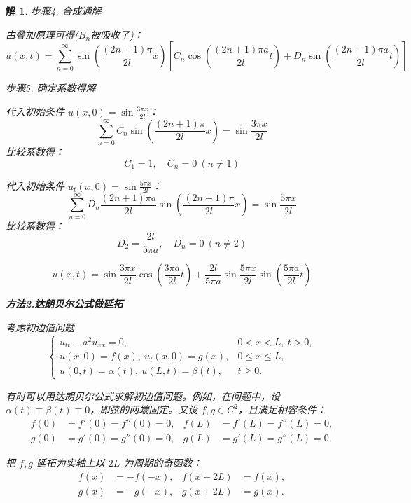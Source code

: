\documentclass[12pt,a4paper]{article}
\newtheorem*{solution}{解}
\begin{document}
\begin{solution}
	步骤4. 合成通解
		
	\noindent
	由叠加原理可得($B_n$被吸收了)：
	\[
	u(x,t) = \sum_{n=0}^\infty \sin\left( \frac{(2n+1)\pi}{2l} x \right) \left[ C_n \cos\left( \frac{(2n+1)\pi a}{2l} t \right) + D_n \sin\left( \frac{(2n+1)\pi a}{2l} t \right) \right]
	\]
	
步骤5. 确定系数得解
		
	\noindent
	代入初始条件 \( u(x,0) = \sin\frac{3\pi x}{2l} \)：
	\[
	\sum_{n=0}^\infty C_n \sin\left( \frac{(2n+1)\pi}{2l} x \right) = \sin\frac{3\pi x}{2l}
	\]
	比较系数得：
	\[
	C_1 = 1,\quad C_n = 0\ (n \neq 1)
	\]
	
	代入初始条件 \( u_t(x,0) = \sin\frac{5\pi x}{2l} \)：
	\[
	\sum_{n=0}^\infty D_n \frac{(2n+1)\pi a}{2l} \sin\left( \frac{(2n+1)\pi}{2l} x \right) = \sin\frac{5\pi x}{2l}
	\]
	比较系数得：
	\[
	D_2 = \frac{2l}{5\pi a},\quad D_n = 0\ (n \neq 2)
	\]
	
	\[
	u(x,t) = \sin\frac{3\pi x}{2l} \cos\left( \frac{3\pi a}{2l} t \right) + \frac{2l}{5\pi a} \sin\frac{5\pi x}{2l} \sin\left( \frac{5\pi a}{2l} t \right)
	\]
	
	
	\newpage
	\textbf{方法2.达朗贝尔公式做延拓}


考虑初边值问题
\begin{equation*}
	\begin{cases}
		u_{tt} - a^2 u_{xx} = 0, & 0 < x < L, \ t > 0, \\
		u(x, 0) = f(x), \ u_t(x, 0) = g(x), & 0 \leq x \leq L, \\
		u(0, t) = \alpha(t), \ u(L, t) = \beta(t), & t \geq 0.
	\end{cases}
\end{equation*}
	
	有时可以用达朗贝尔公式求解初边值问题。例如，在问题中，设 \(\alpha(t) \equiv \beta(t) \equiv 0\)，即弦的两端固定。又设 \(f, g \in C^2\)，且满足相容条件：
	\begin{equation*}
		\begin{aligned}
			f(0) &= f'(0) = f''(0) = 0, & f(L) &= f'(L) = f''(L) = 0, \\
			g(0) &= g'(0) = g''(0) = 0, & g(L) &= g'(L) = g''(L) = 0.
		\end{aligned}
	\end{equation*}
	
	把 \(f, g\) 延拓为实轴上以 \(2L\) 为周期的奇函数：	
	\begin{equation*}
		\begin{aligned}
			f(x) &= -f(-x), & f(x + 2L) &= f(x), \\
			g(x) &= -g(-x), & g(x + 2L) &= g(x).
		\end{aligned}
	\end{equation*}
	

\end{solution}
\end{document}
